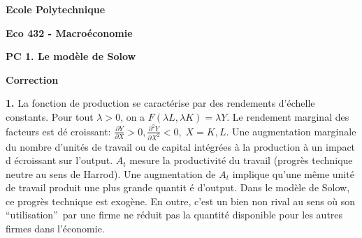 \documentclass[11pt,a4paper]{article}
\begin{document}
\begin{center}
\textbf{Ecole Polytechnique}

\bigskip 

\textbf{Eco 432 - Macro\'{e}conomie}

\bigskip 

\textbf{PC 1. Le mod\`{e}le de Solow}

\bigskip 

\textbf{Correction}

\hspace{1.0in}
\end{center}

\bigskip

\noindent \textbf{1.} La fonction de production se caract\'{e}rise par des
rendements d'\'{e}chelle constants. Pour tout $\lambda >0$, on a $F(\lambda
L,\lambda K)=\lambda Y$. Le rendement marginal des facteurs est d\'{e}%
croissant: $\frac{\partial Y}{\partial X}>0,\frac{\partial ^{2}Y}{\partial
X^{2}}<0,\;X=K,L$. Une augmentation marginale du nombre d'unit\'{e}s de
travail ou de capital int\'{e}gr\'{e}es \`{a} la production \`{a} un impact d%
\'{e}croissant sur l'output. $A_{t}$ mesure la productivit\'{e} du travail
(progr\`{e}s technique neutre au sens de Harrod). Une augmentation de $A_{t}$
implique qu'une m\^{e}me unit\'{e} de travail produit une plus grande quantit%
\'{e} d'output. Dans le mod\`{e}le de Solow, ce progr\`{e}s technique est
exog\`{e}ne. En outre, c'est un bien non rival au sens o\`{u} son
\textquotedblleft utilisation\textquotedblright\ par une firme ne r\'{e}duit
pas la quantit\'{e} disponible pour les autres firmes dans l'\'{e}conomie.
\end{document}
